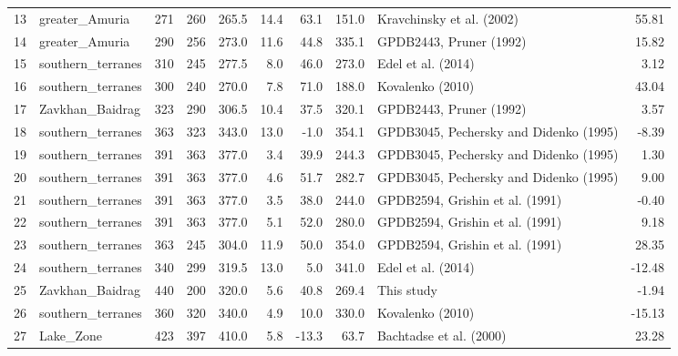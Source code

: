 \documentclass[11pt]{article}
\begin{document}
\begin{sidewaystable}
{\begin{tabular}{llrrrrrrlr}
13 &     greater\_Amuria &       271 &      260 &       265.5 &  14.4 &  63.1 &  151.0 &               Kravchinsky et al. (2002) &     55.81 \\
14 &     greater\_Amuria &       290 &      256 &       273.0 &  11.6 &  44.8 &  335.1 &                 GPDB2443, Pruner (1992) &     15.82 \\
15 &  southern\_terranes &       310 &      245 &       277.5 &   8.0 &  46.0 &  273.0 &                      Edel et al. (2014) &      3.12 \\
16 &  southern\_terranes &       300 &      240 &       270.0 &   7.8 &  71.0 &  188.0 &                        Kovalenko (2010) &     43.04 \\
17 &    Zavkhan\_Baidrag &       323 &      290 &       306.5 &  10.4 &  37.5 &  320.1 &                 GPDB2443, Pruner (1992) &      3.57 \\
18 &  southern\_terranes &       363 &      323 &       343.0 &  13.0 &  -1.0 &  354.1 &  GPDB3045, Pechersky and Didenko (1995) &     -8.39 \\
19 &  southern\_terranes &       391 &      363 &       377.0 &   3.4 &  39.9 &  244.3 &  GPDB3045, Pechersky and Didenko (1995) &      1.30 \\
20 &  southern\_terranes &       391 &      363 &       377.0 &   4.6 &  51.7 &  282.7 &  GPDB3045, Pechersky and Didenko (1995) &      9.00 \\
21 &  southern\_terranes &       391 &      363 &       377.0 &   3.5 &  38.0 &  244.0 &         GPDB2594, Grishin et al. (1991) &     -0.40 \\
22 &  southern\_terranes &       391 &      363 &       377.0 &   5.1 &  52.0 &  280.0 &         GPDB2594, Grishin et al. (1991) &      9.18 \\
23 &  southern\_terranes &       363 &      245 &       304.0 &  11.9 &  50.0 &  354.0 &         GPDB2594, Grishin et al. (1991) &     28.35 \\
24 &  southern\_terranes &       340 &      299 &       319.5 &  13.0 &   5.0 &  341.0 &                      Edel et al. (2014) &    -12.48 \\
25 &    Zavkhan\_Baidrag &       440 &      200 &       320.0 &   5.6 &  40.8 &  269.4 &                              This study &     -1.94 \\
26 &  southern\_terranes &       360 &      320 &       340.0 &   4.9 &  10.0 &  330.0 &                        Kovalenko (2010) &    -15.13 \\
27 &          Lake\_Zone &       423 &      397 &       410.0 &   5.8 & -13.3 &   63.7 &                 Bachtadse et al. (2000) &     23.28 \\

\end{tabular}}
\end{sidewaystable}
\end{document}
